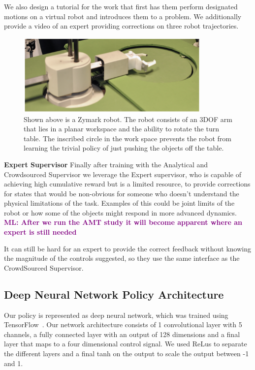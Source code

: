 \documentclass[10pt, conference]{ieeeconf}      %
\newcommand{\mlnote}[1]{\ifthenelse{ \boolean{include-notes}}%
 {\textcolor{purple}{\textbf{ML: #1}}}{}}
\begin{document}
We also design a tutorial for the work that first has them perform designated motions on a virtual robot and introduces them to a problem. We additionally provide a video of an expert providing corrections on three robot trajectories. 

\begin{figure}[t!]
\centering
\includegraphics[width=\columnwidth, height=4cm]{f_figs/robot.pdf}
\caption{ \footnotesize Shown above is a Zymark robot. The robot consists of an 3DOF arm that lies in a planar workspace and the ability to rotate the turn table. The inscribed circle in the work space prevents the robot from learning the trivial policy of just pushing the objects off the table.}
\vspace*{-10pt}
\label{fig:robot}
\end{figure}


\noindent \textbf{Expert Supervisor} Finally after training with the Analytical and Crowdsourced Supervisor we leverage the Expert supervisor, who is capable of achieving high cumulative reward but is a limited resource, to provide corrections for states that would be non-obvious for someone who doesn't understand the physical limitations of the task. Examples of this could be joint limits of the robot or how some of the objects might respond in more advanced dynamics. \mlnote{After we run the AMT study it will become apparent where an expert is still needed}

It can still be hard for an expert to provide the correct feedback without knowing the magnitude of the controls suggested, so they use the same interface as the CrowdSourced Supervisor. 

\subsection{Deep Neural Network Policy Architecture}
Our policy is represented as deep neural network, which was trained using TensorFlow~\cite{tensorflow2015-whitepaper}. Our network architecture consists of 1 convolutional layer with 5 channels, a fully connected layer with an output of 128 dimensions and a final layer that maps to a four dimensional control signal. We used ReLus to separate the different layers and a final tanh on the output to scale the output between -1 and 1. 
\end{document}
